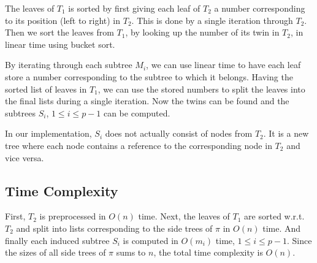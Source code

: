 The leaves of $T_1$ is sorted by first giving each leaf of $T_2$ a number corresponding to its position (left to right) in $T_2$. This is done by a single iteration through $T_2$. Then we sort the leaves from $T_1$, by looking up the number of its twin in $T_2$, in linear time using bucket sort.



By iterating through each subtree $M_i$, we can use linear time to have each leaf store a number corresponding to the subtree to which it belongs. Having the sorted list of leaves in $T_1$, we can use the stored numbers to split the leaves into the final lists during a single iteration. Now the twins can be found and the subtrees $S_i$, $1 \le i \le p-1$ can be computed.

In our implementation, $S_i$ does not actually consist of nodes from $T_2$. It is a new tree where each node contains a reference to the corresponding node in $T_2$ and vice versa.

\subsection{Time Complexity}
First, $T_2$ is preprocessed in $O(n)$ time. Next, the leaves of $T_1$ are sorted w.r.t. $T_2$ and split into lists corresponding to the side trees of $\pi$ in $O(n)$ time. And finally each induced subtree $S_i$ is computed in $O(m_i)$ time, $1 \le i \le p-1$. Since the sizes of all side trees of $\pi$ sums to $n$, the total time complexity is $O(n)$.

